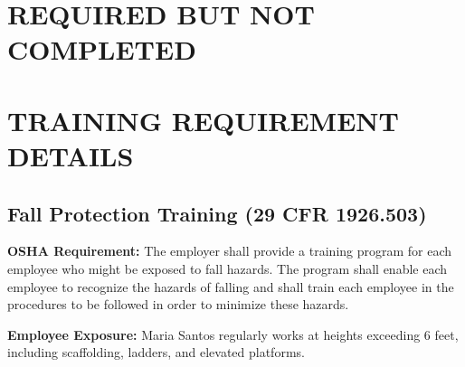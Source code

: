 \documentclass[11pt]{article}
\begin{document}
\vspace{2em}

\section*{REQUIRED BUT NOT COMPLETED}

\begin{center}
\end{center}

\vspace{2em}

\section*{TRAINING REQUIREMENT DETAILS}

\subsection*{Fall Protection Training (29 CFR 1926.503)}

\textbf{OSHA Requirement:} The employer shall provide a training program for each employee who might be exposed to fall hazards. The program shall enable each employee to recognize the hazards of falling and shall train each employee in the procedures to be followed in order to minimize these hazards.

\textbf{Employee Exposure:} Maria Santos regularly works at heights exceeding 6 feet, including scaffolding, ladders, and elevated platforms.
\end{document}
